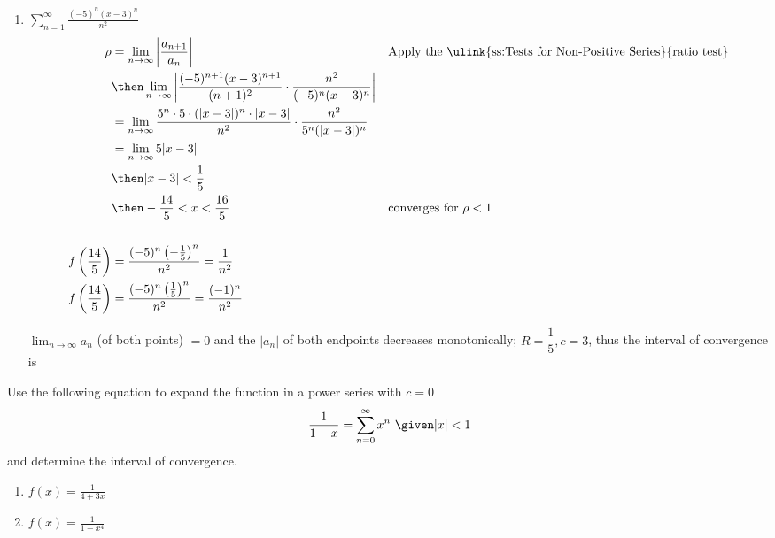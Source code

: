 \begin{enumerate}[itemsep=24em]
\newpage %

  \item \(\displaystyle \sum_{n=1}^{\infty} \frac{(-5)^n(x-3)^n}{n^2} \)
    \begin{align*}
      \rho &= \lim_{n \to \infty} \left| \frac{a_{n+1}}{a_n}  \right|
           && \text{Apply the \ulink{ss:Tests for Non-Positive Series}{ratio test}} \\
      &\then \lim_{n \to \infty} \left|
      \frac{(-5)^{n+1} (x-3)^{n+1}}{(n+1)^2} \cdot
      \frac{n^2}{(-5)^n(x-3)^n}
      \right| \\
      &= \lim_{n \to \infty}
      \frac{5^n\cdot 5 \cdot (|x-3|)^{n} \cdot |x-3|}{n^2} \cdot
      \frac{n^2}{5^n(|x-3|)^n} \\
      &=\lim_{n \to \infty} 5|x-3| \\
      &\then |x-3| < \frac{1}{5} \\
      &\then -\frac{14}{5} < x < \frac{16}{5}
      && \text{converges for}~\rho < 1 \\
      \\
      f\left(\frac{14}{5}\right) &= \frac{(-5)^n\left(-\frac{1}{5}\right)^n}{n^2} = \frac{1}{n^2}
      \\
      f\left(\frac{14}{5}\right) &= \frac{(-5)^n\left(\frac{1}{5}\right)^n}{n^2} = \frac{(-1)^n}{n^2}
    \end{align*}

    \(\lim_{n \to \infty}  a_n\) (of both points) \(= 0\) and the \(|a_n|\) of both
    endpoints decreases monotonically; \(R = \dfrac{1}{5}, c = 3\), thus the
    interval of convergence is 


\end{enumerate}

\newpage %

Use the following equation to expand the function in a power series with \(c =
0\) \[~\displaystyle \frac{1}{1-x} =
\sum_{n=0}^{\infty} x^n ~\given |x| < 1 \]
and determine the interval of convergence.

\begin{enumerate}[itemsep=24em, resume]

  \item  \(\displaystyle f(x) = \frac{1}{4+3x} \)

  \item  \(\displaystyle f(x) = \frac{1}{1-x^4} \)
\end{enumerate}
\newpage %

